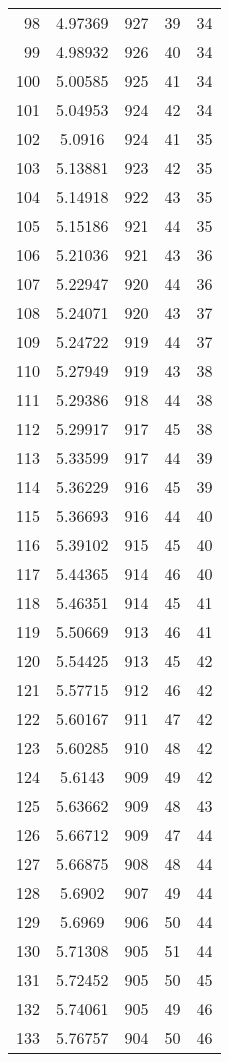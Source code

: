 \documentclass[12pt,a4paper]{article}
\begin{document}
\begin{tabular}{r|cccc}
	98 & 4.97369 & 927 & 39 & 34 \\
	99 & 4.98932 & 926 & 40 & 34 \\
	100 & 5.00585 & 925 & 41 & 34 \\
	101 & 5.04953 & 924 & 42 & 34 \\
	102 & 5.0916 & 924 & 41 & 35 \\
	103 & 5.13881 & 923 & 42 & 35 \\
	104 & 5.14918 & 922 & 43 & 35 \\
	105 & 5.15186 & 921 & 44 & 35 \\
	106 & 5.21036 & 921 & 43 & 36 \\
	107 & 5.22947 & 920 & 44 & 36 \\
	108 & 5.24071 & 920 & 43 & 37 \\
	109 & 5.24722 & 919 & 44 & 37 \\
	110 & 5.27949 & 919 & 43 & 38 \\
	111 & 5.29386 & 918 & 44 & 38 \\
	112 & 5.29917 & 917 & 45 & 38 \\
	113 & 5.33599 & 917 & 44 & 39 \\
	114 & 5.36229 & 916 & 45 & 39 \\
	115 & 5.36693 & 916 & 44 & 40 \\
	116 & 5.39102 & 915 & 45 & 40 \\
	117 & 5.44365 & 914 & 46 & 40 \\
	118 & 5.46351 & 914 & 45 & 41 \\
	119 & 5.50669 & 913 & 46 & 41 \\
	120 & 5.54425 & 913 & 45 & 42 \\
	121 & 5.57715 & 912 & 46 & 42 \\
	122 & 5.60167 & 911 & 47 & 42 \\
	123 & 5.60285 & 910 & 48 & 42 \\
	124 & 5.6143 & 909 & 49 & 42 \\
	125 & 5.63662 & 909 & 48 & 43 \\
	126 & 5.66712 & 909 & 47 & 44 \\
	127 & 5.66875 & 908 & 48 & 44 \\
	128 & 5.6902 & 907 & 49 & 44 \\
	129 & 5.6969 & 906 & 50 & 44 \\
	130 & 5.71308 & 905 & 51 & 44 \\
	131 & 5.72452 & 905 & 50 & 45 \\
	132 & 5.74061 & 905 & 49 & 46 \\
	133 & 5.76757 & 904 & 50 & 46 \\

\end{tabular}
\end{document}
